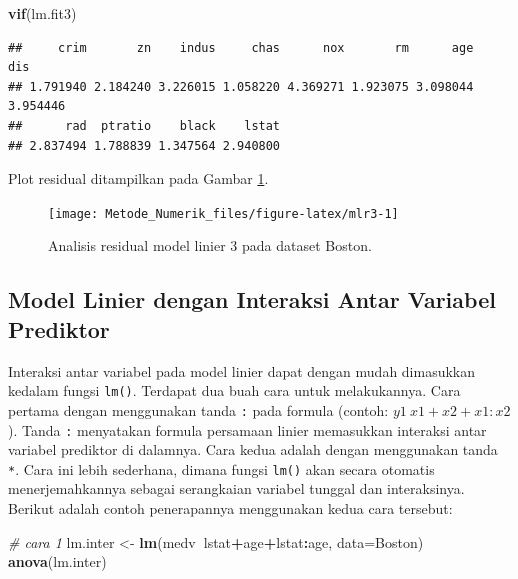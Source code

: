 \documentclass[]{book}
\newenvironment{Shaded}{\begin{snugshade}}{\end{snugshade}}
\newcommand{\CommentTok}[1]{\textcolor[rgb]{0.56,0.35,0.01}{\textit{#1}}}
\newcommand{\DataTypeTok}[1]{\textcolor[rgb]{0.13,0.29,0.53}{#1}}
\newcommand{\KeywordTok}[1]{\textcolor[rgb]{0.13,0.29,0.53}{\textbf{#1}}}
\newcommand{\NormalTok}[1]{#1}
\newcommand{\OperatorTok}[1]{\textcolor[rgb]{0.81,0.36,0.00}{\textbf{#1}}}
\newcommand{\StringTok}[1]{\textcolor[rgb]{0.31,0.60,0.02}{#1}}
\theoremstyle{definition}
\theoremstyle{definition}
\theoremstyle{definition}
\theoremstyle{remark}
\begin{document}
\begin{Shaded}
\begin{Highlighting}[]
\KeywordTok{vif}\NormalTok{(lm.fit3)}
\end{Highlighting}
\end{Shaded}

\begin{verbatim}
##     crim       zn    indus     chas      nox       rm      age      dis 
## 1.791940 2.184240 3.226015 1.058220 4.369271 1.923075 3.098044 3.954446 
##      rad  ptratio    black    lstat 
## 2.837494 1.788839 1.347564 2.940800
\end{verbatim}

Plot residual ditampilkan pada Gambar \ref{fig:mlr3}.

\begin{figure}

{\centering \texttt{[image: Metode\_Numerik\_files/figure-latex/mlr3-1]} 

}

\caption{Analisis residual model linier 3 pada dataset Boston.}\label{fig:mlr3}
\end{figure}

\hypertarget{lminter}{%
\subsection{Model Linier dengan Interaksi Antar Variabel Prediktor}\label{lminter}}

Interaksi antar variabel pada model linier dapat dengan mudah dimasukkan kedalam fungsi \texttt{lm()}. Terdapat dua buah cara untuk melakukannya. Cara pertama dengan menggunakan tanda \texttt{:} pada formula (contoh: \(y1 ~ x1+x2+x1:x2\)). Tanda \texttt{:} menyatakan formula persamaan linier memasukkan interaksi antar variabel prediktor di dalamnya. Cara kedua adalah dengan menggunakan tanda \texttt{*}. Cara ini lebih sederhana, dimana fungsi \texttt{lm()} akan secara otomatis menerjemahkannya sebagai serangkaian variabel tunggal dan interaksinya. Berikut adalah contoh penerapannya menggunakan kedua cara tersebut:

\begin{Shaded}
\begin{Highlighting}[]
\CommentTok{# cara 1}
\NormalTok{lm.inter <-}\StringTok{ }\KeywordTok{lm}\NormalTok{(medv}\OperatorTok{~}\NormalTok{lstat}\OperatorTok{+}\NormalTok{age}\OperatorTok{+}\NormalTok{lstat}\OperatorTok{:}\NormalTok{age, }\DataTypeTok{data=}\NormalTok{Boston)}
\KeywordTok{anova}\NormalTok{(lm.inter)}
\end{Highlighting}
\end{Shaded}
\end{document}
